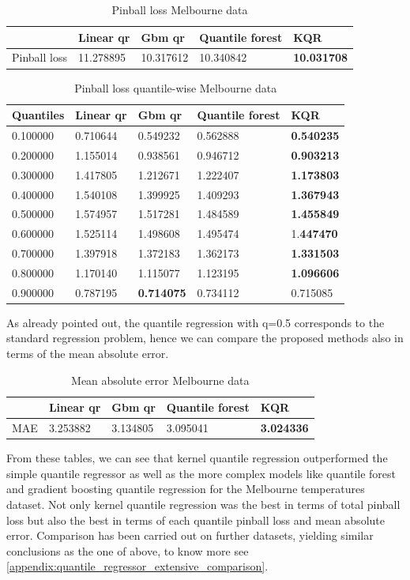 \begin{table}[!h]
\caption{Pinball loss Melbourne data}
\begin{tabular}{lllll}
    \toprule
     & Linear qr & Gbm qr & Quantile forest & KQR \\
    \midrule
    Pinball loss & 11.278895 & 10.317612 & 10.340842 & \textbf{10.031708} \\
    \bottomrule
    \end{tabular}
\end{table}

\begin{table}[!h]
    \caption{Pinball loss quantile-wise Melbourne data}
    \begin{tabular}{lllll}
    \toprule
    Quantiles & Linear qr & Gbm qr & Quantile forest & KQR \\
    \midrule
    0.100000 & 0.710644 & 0.549232 & 0.562888 & \textbf{0.540235} \\
    0.200000 & 1.155014 & 0.938561 & 0.946712 & \textbf{0.903213} \\
    0.300000 & 1.417805 & 1.212671 & 1.222407 & \textbf{1.173803} \\
    0.400000 & 1.540108 & 1.399925 & 1.409293 & \textbf{1.367943} \\
    0.500000 & 1.574957 & 1.517281 & 1.484589 & \textbf{1.455849} \\
    0.600000 & 1.525114 & 1.498608 & 1.495474 & 1.\textbf{447470} \\
    0.700000 & 1.397918 & 1.372183 & 1.362173 & \textbf{1.331503} \\
    0.800000 & 1.170140 & 1.115077 & 1.123195 & \textbf{1.096606} \\
    0.900000 & 0.787195 & \textbf{0.714075} & 0.734112 & 0.715085 \\
    \bottomrule
    \end{tabular}
\end{table}
As already pointed out, the quantile regression with q=0.5 corresponds to the standard regression problem, hence we can compare the proposed methods also in terms of the mean absolute error.
\begin{table}[!h]
\caption{Mean absolute error Melbourne data}
\begin{tabular}{lllll}
    \toprule
     & Linear qr & Gbm qr & Quantile forest & KQR \\
    \midrule
    MAE & 3.253882 & 3.134805 & 3.095041 & \textbf{3.024336} \\
    \bottomrule
    \end{tabular}
\end{table}  
From these tables, we can see that kernel quantile regression outperformed the simple quantile regressor as well as the more complex models like quantile forest and gradient boosting quantile regression for the Melbourne temperatures dataset. Not only kernel quantile regression was the best in terms of total pinball loss but also the best in terms of each quantile pinball loss and mean absolute error.
Comparison has been carried out on further datasets, yielding similar conclusions as the one of above, to know more see \ref{appendix:quantile_regressor_extensive_comparison}.

